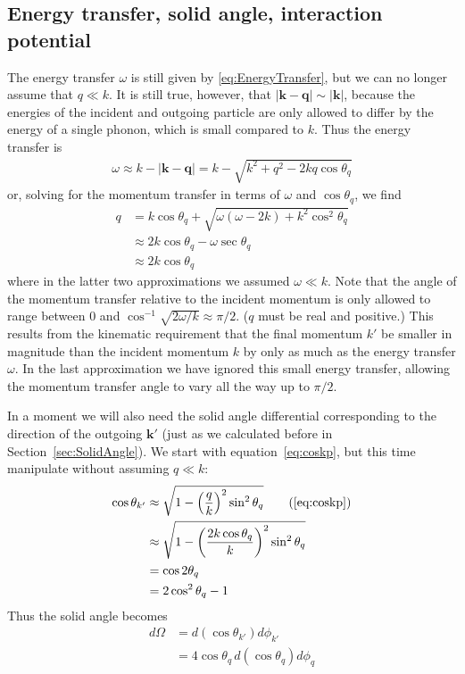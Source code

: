 \documentclass{article}
\begin{document}
\subsection{Energy transfer, solid angle, interaction potential}

The energy transfer $\omega$ is still given by \eqref{eq:EnergyTransfer}, but we can no longer assume that $q \ll k$. It is still true, however, that $|\textbf{k} - \textbf{q}| \sim |\textbf{k}|$, because the energies of the incident and outgoing particle are only allowed to differ by the energy of a single phonon, which is small compared to $k$. Thus the energy transfer is
\begin{align}
\omega \approx k - |\textbf{k} - \textbf{q}| = k - \sqrt{k^2 + q^2 - 2 kq \cos\theta_q}
\end{align}
or, solving for the momentum transfer in terms of $\omega$ and $\cos\theta_q$, we find
\begin{align}
q &= k \cos\theta_q + \sqrt{\omega(\omega - 2 k) + k^2 \cos^2 \theta_q} \\
  &\approx 2k \cos\theta_q - \omega \sec \theta_q \\
  &\approx 2k \cos\theta_q \label{eq:DistantBrilliounZone1PhononMomentumTransfer}
\end{align}
where in the latter two approximations we assumed $\omega\ll k$. Note that the angle of the momentum transfer relative to the incident momentum is only allowed to range between $0$ and $\cos^{-1}\sqrt{2 \omega / k} \approx \pi / 2$. ($q$ must be real and positive.) This results from the kinematic requirement that the final momentum $k'$ be smaller in magnitude than the incident momentum $k$ by only as much as the energy transfer $\omega$. In the last approximation we have ignored this small energy transfer, allowing the momentum transfer angle to vary all the way up to $\pi / 2$.

In a moment we will also need the solid angle differential corresponding to the direction of the outgoing $\textbf{k}'$ (just as we calculated before in Section~\ref{sec:SolidAngle}). We start with equation~\eqref{eq:coskp}, but this time manipulate without assuming $q\ll k$:
\begin{align}
\cos\theta_{k'} &\approx\sqrt{1 - \left( \frac{q}{k} \right)^2 \sin^2 \theta_q} \tag{\ref{eq:coskp}}\\
  &\approx \sqrt{1 - \left( \frac{2 k \cos\theta_q}{k} \right)^2 \sin^2 \theta_q} \\
  &= \cos 2 \theta_q \\
  &= 2 \cos^2 \theta_q - 1
\end{align}
Thus the solid angle becomes
\begin{align}
d \Omega &= d(\cos\theta_{k'})d \phi_{k'} \\
   &= 4\cos\theta_q\, d(\cos\theta_q)d \phi_q
\end{align}
\end{document}
